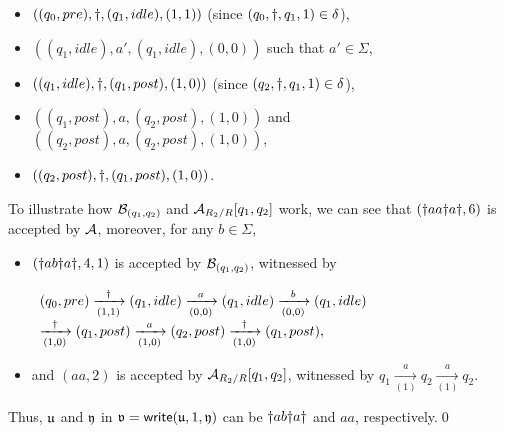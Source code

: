 \begin{example}
\begin{itemize}
\begin{itemize}
\item $((q_0, pre), \dag, (q_1, idle), (1, 1))$ (since $(q_0, \dag, q_1, 1) \in \delta$),
%
\item $((q_1, idle), a', (q_1, idle), (0, 0))$ such that $a' \in \Sigma$, 
%
\item $((q_1, idle), \dag, (q_1, post), (1, 0))$  (since $(q_2, \dag, q_1, 1) \in \delta$),
%
\item $((q_1, post), a, (q_2, post), (1, 0))$ and $((q_2, post), a, (q_2, post), (1, 0))$,
%
\item $((q_2, post), \dag, (q_1, post), (1, 0))$.
%
\end{itemize}
\end{itemize}
To illustrate how $\mathcal{B}_{(q_1, q_2)}$ and $\mathcal{A}_{R_2/R}[q_1,q_2]$ work, we can see that $(\dag aa \dag a \dag, 6)$ is accepted by $\mathcal{A}$, moreover,  for any $b\in\Sigma$,
\begin{itemize}[topsep=0pt,partopsep=0pt]
\item $(\dag ab \dag a \dag, 4, 1)$ is accepted by $\mathcal{B}_{(q_1, q_2)}$, witnessed by %
\begin{center}
    $\begin{array}{l}
(q_0, pre) \xrightarrow[(1, 1)]{\dag} (q_1, idle) \xrightarrow[(0, 0)]{a} (q_1, idle) \xrightarrow[(0, 0)]{b} (q_1, idle) \\
\xrightarrow[(1, 0)]{\dag} (q_1, post) \xrightarrow[(1, 0)]{a} (q_2, post) \xrightarrow[(1, 0)]{\dag} (q_1, post),
\end{array}$
\end{center}
%
\item and $(aa, 2)$ is accepted by $\mathcal{A}_{R_2/R}[q_1,q_2]$, witnessed by %
$
q_1 \xrightarrow[(1)]{a} q_2  \xrightarrow[(1)]{a} q_2
$.  
\end{itemize}
Thus, $\mathfrak{u}$ and $\mathfrak{y}$  in $\mathfrak{v} = \mathsf{write}(\mathfrak{u}, 1, \mathfrak{y})$
can be $\dag ab \dag a \dag$ and $aa$, respectively.\qed


\end{example}
